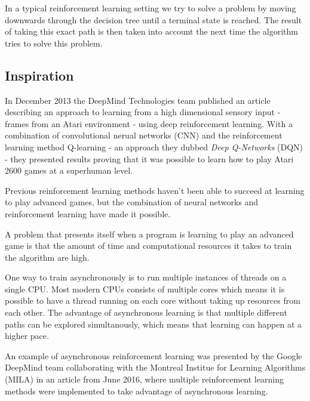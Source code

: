 \documentclass[11pt]{article}
\begin{document}
In a typical reinforcement learning setting we try to solve a problem
by moving downwards through the decision tree until a terminal state is reached.
The result of taking this exact path is then
taken into account the next time the algorithm tries to solve this problem.

\subsection{Inspiration}

In December 2013 the DeepMind Technologies team published an article
describing an approach to learning from a high dimensional sensory input -
frames from an Atari environment -
using deep reinforcement learning\cite{dqn}.
With a combination of convolutional nerual networks (CNN) and
the reinforcement learning method Q-learning\cite{RLbook} - an approach they
dubbed \textit{Deep Q-Networks} (DQN) - they
presented results proving that it was possible to learn how to play Atari
2600 games at a superhuman level.

Previous reinforcement learning methods haven't been able to succeed at learning to play
advanced games, but the combination of neural networks and
reinforcement learning have made it possible.

A problem that presents itself when a program is learning to play an advanced 
game is that the amount of time and computational resources it takes to train
the algorithm are high.


One way to train asynchronously is to run multiple instances of threads on a single
CPU.
Most modern CPUs consists of multiple cores which means it is possible to have a thread
running on each core without taking up resources from each other.
The advantage of asynchronous learning is that multiple different paths
can be explored simultanously, which means that learning can happen at
a higher pace.

An example of asynchronous reinforcement learning was presented by the
Google DeepMind team collaborating with the Montreal Institue for Learning
Algorithms (MILA) in an article from June 2016, where multiple 
reinforcement learning methods were implemented to take advantage of
asynchronous learning\cite{a3c}.
\end{document}
